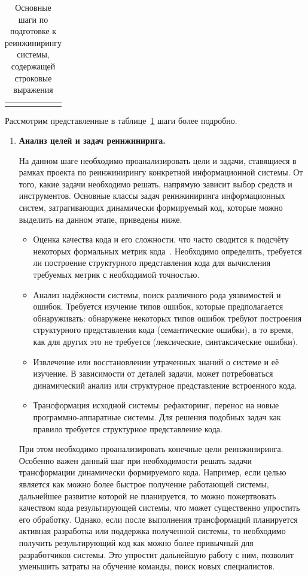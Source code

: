 {\begin{longtable}{| r | p{3cm} | p{3cm} | p{3cm} | p{6cm} |}
  \hline
  \hline
  \caption{Основные шаги по подготовке к реинжинирингу системы, содержащей строковые выражения}\label{tbl:method}
  \end{longtable}
}

Рассмотрим представленные в таблице~\ref{tbl:method} шаги более подробно.

\begin{enumerate}
  \item \textbf{Анализ целей и задач реинжинирига.}
  
  На данном шаге необходимо проанализировать цели и задачи, ставящиеся в рамках проекта по реинжинирингу конкретной информационной системы. От того, какие задачи необходимо решать, напрямую зависит выбор средств и инструментов. Основные классы задач реинжиниринга информационных систем, затрагивающих динамически формируемый код, которые можно выделить на данном этапе, приведены ниже.
  
  \begin{itemize}
    \item Оценка качества кода и его сложности, что часто сводится к подсчёту некоторых формальных метрик кода~\cite{SoftwareMetrics, DSQLQualityMesureBIG}. Необходимо определить, требуется ли построение структурного представления кода для вычисления требуемых метрик с необходимой точностью.
    \item Анализ надёжности системы, поиск различного рода уязвимостей и ошибок. Требуется изучение типов ошибок, которые предполагается обнаруживать: обнаружене некоторых типов ошибок требуют построения структурного представления кода (семантические ошибки), в то время, как для других это не требуется (лексические, синтаксические ошибки).
    \item Извлечение или восстановлении утраченных знаний о системе и её изучение. В зависимости от деталей задачи, может потребоваться динамический анализ или структурное представление встроенного кода.
    \item Трансформация исходной системы: рефакторинг, перенос на новые программно-аппаратные системы. Для решения подобных задач как правило требуется структурное представление кода.
  \end{itemize}
  
  При этом необходимо проанализировать конечные цели реинжиниринга. Особенно важен данный шаг при необходимости решать задачи трансформации динамически формируемого кода. Например, если целью является как можно более быстрое получение работающей системы, дальнейшее развитие которой не планируется, то можно пожертвовать качеством кода результирующей системы, что может существенно упростить его обработку. Однако, если после выполнения трансформаций планируется активная разработка или поддержка полученной системы, то необходимо получить результирующий код как можно более привычный для разработчиков системы. Это упростит дальнейшую работу с ним, позволит уменьшить затраты на обучение команды, поиск новых специалистов.
  

\end{enumerate}
